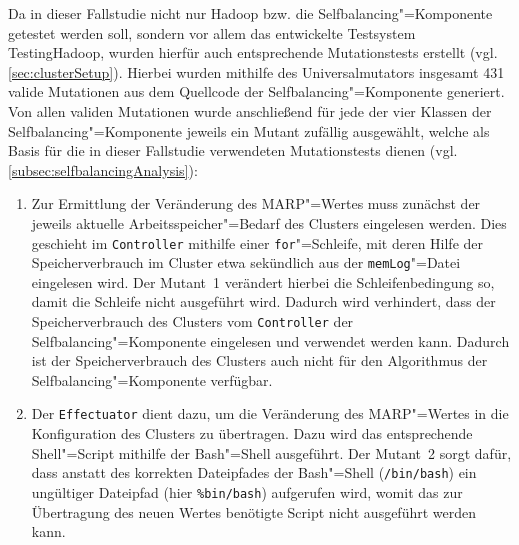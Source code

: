 Da in dieser Fallstudie nicht nur Hadoop bzw. die Selfbalancing"=Komponente getestet werden soll, sondern vor allem das entwickelte Testsystem TestingHadoop, wurden hierfür auch entsprechende Mutationstests erstellt (vgl. \cref{sec:clusterSetup}).
Hierbei wurden mithilfe des Universalmutators insgesamt 431 valide Mutationen aus dem Quellcode der Selfbalancing"=Komponente generiert.
Von allen validen Mutationen wurde anschließend für jede der vier Klassen der Selfbalancing"=Komponente jeweils ein Mutant zufällig ausgewählt, welche als Basis für die in dieser Fallstudie verwendeten Mutationstests dienen (vgl. \cref{subsec:selfbalancingAnalysis}):

\begin{enumerate}[itemsep=5pt]
    \item
    Zur Ermittlung der Veränderung des \gls{MARP}"=Wertes muss zunächst der jeweils aktuelle Arbeitsspeicher"=Bedarf des Clusters eingelesen werden.
    Dies geschieht im \texttt{Controller} mithilfe einer \texttt{for}"=Schleife, mit deren Hilfe der Speicherverbrauch im Cluster etwa sekündlich aus der \texttt{memLog}"=Datei eingelesen wird.
    Der Mutant~1 verändert hierbei die Schleifenbedingung so, damit die Schleife nicht ausgeführt wird.
    Dadurch wird verhindert, dass der Speicherverbrauch des Clusters vom \texttt{Controller} der Selfbalancing"=Komponente eingelesen und verwendet werden kann.
    Dadurch ist der Speicherverbrauch des Clusters auch nicht für den Algorithmus \cite{Zhang2016} der Selfbalancing"=Komponente verfügbar.
    
    \item 
    Der \texttt{Effectuator} dient dazu, um die Veränderung des \gls{MARP}"=Wertes in die Konfiguration des Clusters zu übertragen.
    Dazu wird das entsprechende Shell"=Script mithilfe der Bash"=Shell ausgeführt.
    Der Mutant~2 sorgt dafür, dass anstatt des korrekten Dateipfades der Bash"=Shell (\texttt{/bin/bash}) ein ungültiger Dateipfad (hier \texttt{\%bin/bash}) aufgerufen wird, womit das zur Übertragung des neuen Wertes benötigte Script nicht ausgeführt werden kann.
    

\end{enumerate}
